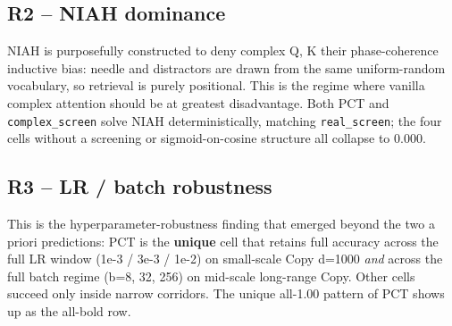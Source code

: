 \documentclass[11pt,a4paper]{article}
\theoremstyle{plain}
\theoremstyle{definition}
\begin{document}
\subsection{R2 -- NIAH dominance}
\noindent
\begin{minipage}[t]{0.72\textwidth}
\vspace{0pt}
NIAH is purposefully constructed to deny complex Q, K their phase-coherence inductive bias: needle and distractors are drawn from the same uniform-random vocabulary, so retrieval is purely positional. This is the regime where vanilla complex attention should be at greatest disadvantage. Both PCT and \texttt{complex\_screen} solve NIAH deterministically, matching \texttt{real\_screen}; the four cells without a screening or sigmoid-on-cosine structure all collapse to 0.000.
\end{minipage}\hfill
\begin{minipage}[t]{0.22\textwidth}
\vspace{0pt}
\centering
\scriptsize
\captionsetup{skip=2pt}
\setlength{\tabcolsep}{3pt}
\renewcommand{\arraystretch}{1.1}
\end{minipage}
\par\medskip

\subsection{R3 -- LR / batch robustness}
This is the hyperparameter-robustness finding that emerged beyond the two a priori predictions: PCT is the \textbf{unique} cell that retains full accuracy across the full LR window (1e-3 / 3e-3 / 1e-2) on small-scale Copy d=1000 \emph{and} across the full batch regime (b=8, 32, 256) on mid-scale long-range Copy. Other cells succeed only inside narrow corridors. The unique all-1.00 pattern of PCT shows up as the all-bold row.
\end{document}
